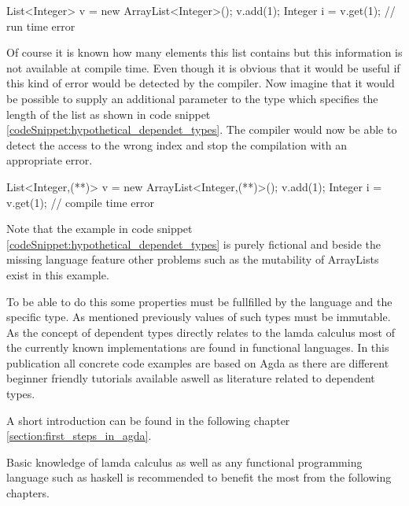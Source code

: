 \begin{codesnippet}[caption={ArrayList index error}, label={codeSnippet:array_index_error}]
List<Integer> v = new ArrayList<Integer>();
v.add(1);
Integer i = v.get(1); // run time error
\end{codesnippet}

Of course it is known how many elements this list contains but this information is not available at compile time. Even though it is obvious that it would be useful if this kind of error would be detected by the compiler. 
Now imagine that it would be possible to supply an additional parameter to the type which specifies the length of the list as shown in code snippet \ref{codeSnippet:hypothetical_dependet_types}. 
The compiler would now be able to detect the access to the wrong index and stop the compilation with an appropriate error.

\begin{codesnippet}[escapeinside={(*}{*)}, caption={ArrayList with size parameter}, label={codeSnippet:hypothetical_dependet_types}]
List<Integer,(**)> v = new ArrayList<Integer,(**)>();
v.add(1);
Integer i = v.get(1); // compile time error
\end{codesnippet}


Note that the example in code snippet \ref{codeSnippet:hypothetical_dependet_types} is purely fictional and beside the missing language feature other problems such as the mutability of ArrayLists exist in this example.

To be able to do this some properties must be fullfilled by the language and the specific type. 
As mentioned previously values of such types must be immutable. 
As the concept of dependent types directly relates to the lamda calculus most of the currently known implementations are found in functional languages. 
In this publication all concrete code examples are based on Agda as there are different beginner friendly tutorials available aswell as literature related to dependent types.

A short introduction can be found in the following chapter \ref{section:first_steps_in_agda}.

Basic knowledge of lamda calculus as well as any functional programming language such as haskell is recommended to benefit the most from the following chapters.
